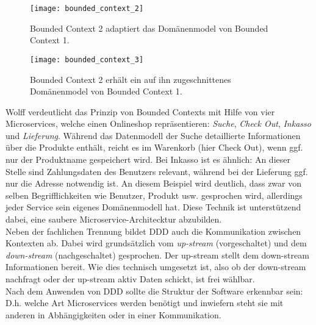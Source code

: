 \begin{figure}[ht]
	\centering
	\texttt{[image: bounded\_context\_2]}
	\caption[Bounded Context 2 adaptiert das Domänenmodel von Bounded Context 1] {Bounded Context 2 adaptiert das Domänenmodel von Bounded Context 1.\cite{wolff2018mic_praxis}}
	\label{fig:bounded_context_with_copied_datamodel}
\end{figure}

\begin{figure}[ht]
	\centering
	\texttt{[image: bounded\_context\_3]}
	\caption[Bounded Context 2 erhält ein auf ihn zugeschnittenes Domänenmodel von Bounded Context 1] {Bounded Context 2 erhält ein auf ihn zugeschnittenes Domänenmodel von Bounded Context 1.\cite{wolff2018mic_praxis}}
	\label{fig:bounded_context_with_custom_datamodels}
\end{figure}

Wolff verdeutlicht das Prinzip von Bounded Contexts mit Hilfe von vier Microservices, welche einen Onlineshop repräsentieren: \textit{Suche}, \textit{Check Out}, \textit{Inkasso} und \textit{Lieferung}. Während das Datenmodell der Suche detaillierte Informationen über die Produkte enthält, reicht es im Warenkorb (hier Check Out), wenn ggf. nur der Produktname gespeichert wird. Bei Inkasso ist es ähnlich: An dieser Stelle sind Zahlungsdaten des Benutzers relevant, während bei der Lieferung ggf. nur die Adresse notwendig ist.\cite{wolff2018mic_praxis} An diesem Beispiel wird deutlich, dass zwar von selben Begrifflichkeiten wie Benutzer, Produkt usw. gesprochen wird, allerdings jeder Service sein eigenes Domänenmodell hat. Diese Technik ist unterstützend dabei, eine saubere Microservice-Architecktur abzubilden.\cite{wolff2018mic_praxis} \cite{heise2016ddd} \\

Neben der fachlichen Trennung bildet DDD auch die Kommunikation zwischen Kontexten ab. Dabei wird grundsätzlich vom \textit{up-stream} (vorgeschaltet) und dem \textit{down-stream} (nachgeschaltet) gesprochen.\cite{wolff2018mic_praxis} Der up-stream stellt dem down-stream Informationen bereit. Wie dies technisch umgesetzt ist, also ob der down-stream nachfragt oder der up-stream aktiv Daten schickt, ist frei wählbar. \\

Nach dem Anwenden von DDD sollte die Struktur der Software erkennbar sein: D.h. welche Art Microservices werden benötigt und inwiefern steht sie mit anderen in Abhängigkeiten oder in einer Kommunikation.   

